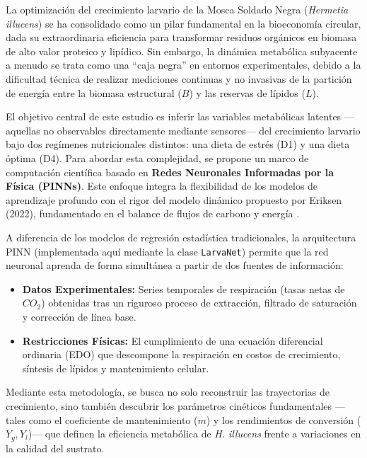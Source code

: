 
La optimización del crecimiento larvario de la Mosca Soldado Negra (\textit{Hermetia illucens}) se ha consolidado como un pilar fundamental en la bioeconomía circular, dada su extraordinaria eficiencia para transformar residuos orgánicos en biomasa de alto valor proteico y lipídico. Sin embargo, la dinámica metabólica subyacente a menudo se trata como una ``caja negra'' en entornos experimentales, debido a la dificultad técnica de realizar mediciones continuas y no invasivas de la partición de energía entre la biomasa estructural ($B$) y las reservas de lípidos ($L$).

El objetivo central de este estudio es inferir las variables metabólicas latentes ---aquellas no observables directamente mediante sensores--- del crecimiento larvario bajo dos regímenes nutricionales distintos: una dieta de estrés (D1) y una dieta óptima (D4). Para abordar esta complejidad, se propone un marco de computación científica basado en \textbf{Redes Neuronales Informadas por la Física (PINNs)}. Este enfoque integra la flexibilidad de los modelos de aprendizaje profundo con el rigor del modelo dinámico propuesto por Eriksen (2022), fundamentado en el balance de flujos de carbono y energía \cite{eriksenDynamicModellingFeed2022}.



A diferencia de los modelos de regresión estadística tradicionales, la arquitectura PINN (implementada aquí mediante la clase \texttt{LarvaNet}) permite que la red neuronal aprenda de forma simultánea a partir de dos fuentes de información:
\begin{itemize}
    \item \textbf{Datos Experimentales:} Series temporales de respiración (tasas netas de $CO_2$) obtenidas tras un riguroso proceso de extracción, filtrado de saturación y corrección de línea base.
    \item \textbf{Restricciones Físicas:} El cumplimiento de una ecuación diferencial ordinaria (EDO) que descompone la respiración en costos de crecimiento, síntesis de lípidos y mantenimiento celular.
\end{itemize}

Mediante esta metodología, se busca no solo reconstruir las trayectorias de crecimiento, sino también descubrir los parámetros cinéticos fundamentales ---tales como el coeficiente de mantenimiento ($m$) y los rendimientos de conversión ($Y_g, Y_l$)--- que definen la eficiencia metabólica de \textit{H. illucens} frente a variaciones en la calidad del sustrato.

